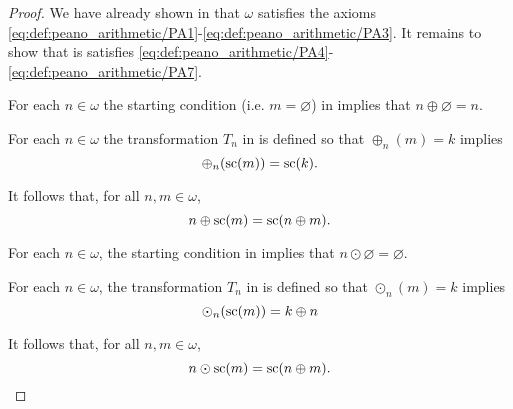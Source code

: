 \begin{proof}
  We have already shown in  that \( \omega \) satisfies the axioms \eqref{eq:def:peano_arithmetic/PA1}-\eqref{eq:def:peano_arithmetic/PA3}. It remains to show that is satisfies \eqref{eq:def:peano_arithmetic/PA4}-\eqref{eq:def:peano_arithmetic/PA7}.

   For each \( n \in \omega \) the starting condition (i.e. \( m = \varnothing \)) in  implies that \( n \oplus \varnothing = n \).

   For each \( n \in \omega \) the transformation \( T_n \) in  is defined so that \( \oplus_n(m) = k \) implies
  \begin{equation*}
    \oplus_n(\op{sc}(m)) = \op{sc}(k).
  \end{equation*}

  It follows that, for all \( n, m \in \omega \),
  \begin{equation*}
    n \oplus \op{sc}(m) = \op{sc}(n \oplus m).
  \end{equation*}

   For each \( n \in \omega \), the starting condition in  implies that \( n \odot \varnothing = \varnothing \).

   For each \( n \in \omega \), the transformation \( T_n \) in  is defined so that \( \odot_n(m) = k \) implies
  \begin{equation*}
    \odot_n(\op{sc}(m)) = k \oplus n
  \end{equation*}

  It follows that, for all \( n, m \in \omega \),
  \begin{equation*}
    n \odot \op{sc}(m) = \op{sc}(n \oplus m).
  \end{equation*}
\end{proof}

